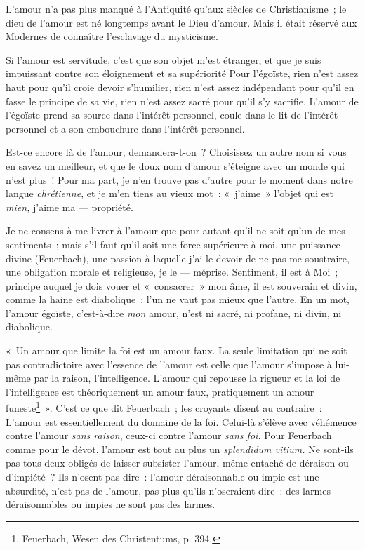\documentclass[french,twoside]{book} %
\begin{document}
L’amour n’a pas plus manqué à l’Antiquité qu’aux siècles de Christianisme ; le dieu de l’amour est né longtemps avant le Dieu d’amour. Mais il était réservé aux Modernes de connaître l’esclavage du mysticisme.\par
 Si l’amour est servitude, c’est que son objet m’est étranger, et que je suis impuissant contre son éloignement et sa supériorité Pour l’égoïste, rien n’est assez haut pour qu’il croie devoir s’humilier, rien n’est assez indépendant pour qu’il en fasse le principe de sa vie, rien n’est assez sacré pour qu’il s’y sacrifie. L’amour de l’égoïste prend sa source dans l’intérêt personnel, coule dans le lit de l’intérêt personnel et a son embouchure dans l’intérêt personnel.\par
Est-ce encore là de l’amour, demandera-t-on ? Choisissez un autre nom si vous en savez un meilleur, et que le doux nom d’amour s’éteigne avec un monde qui n’est plus ! Pour ma part, je n’en trouve pas d’autre pour le moment dans notre langue \emph{chrétienne}, et je m’en tiens au vieux mot : « j’aime » l’objet qui est \emph{mien,} j’aime ma — propriété.\par
Je ne consens à me livrer à l’amour que pour autant qu’il ne soit qu’un de mes sentiments ; mais s’il faut qu’il soit une force supérieure à moi, une puissance divine (Feuerbach), une passion à laquelle j’ai le devoir de ne pas me soustraire, une obligation morale et religieuse, je le — méprise. Sentiment, il est à Moi ; principe auquel je dois vouer et « consacrer » mon âme, il est souverain et divin, comme la haine est diabolique : l’un ne vaut pas mieux que l’autre. En un mot, l’amour égoïste, c’est-à-dire \emph{mon} amour, n’est ni sacré, ni profane, ni divin, ni diabolique.\par
« Un amour que limite la foi est un amour faux. La seule limitation qui ne soit pas contradictoire avec l’essence de l’amour est celle que l’amour s’impose à lui-même par la raison, l’intelligence. L’amour qui repousse la rigueur et la loi de l’intelligence est théoriquement un amour faux, pratiquement un amour funeste\footnote{ \noindent Feuerbach, Wesen des Christentums, p. 394.
 } ». C’est ce que dit Feuerbach ; les croyants disent au contraire : L’amour est essentiellement du domaine de la foi. Celui-là s’élève avec véhémence  contre l’amour \emph{sans raison}, ceux-ci contre l’amour \emph{sans foi.} Pour Feuerbach comme pour le dévot, l’amour est tout au plus un \emph{splendidum vitium.} Ne sont-ils pas tous deux obligés de laisser subsister l’amour, même entaché de déraison ou d’impiété ? Ils n’osent pas dire : l’amour déraisonnable ou impie est une absurdité, n’est pas de l’amour, pas plus qu’ils n’oseraient dire : des larmes déraisonnables ou impies ne sont pas des larmes.\par
\end{document}
